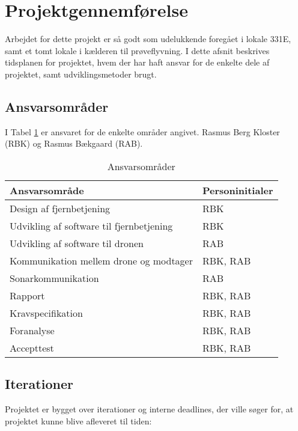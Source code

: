 \documentclass[Main]{subfiles}
\begin{document}
\section{Projektgennemførelse}
Arbejdet for dette projekt er så godt som udelukkende foregået i lokale 331E, samt et tomt lokale i kælderen til prøveflyvning.
I dette afsnit beskrives tidsplanen for projektet, hvem der har haft ansvar for de enkelte dele af projektet, samt udviklingsmetoder brugt.

\subsection{Ansvarsområder}
I Tabel \ref{Tab:ansvar} er ansvaret for de enkelte områder angivet.
Rasmus Berg Kloster (RBK) og Rasmus Bækgaard (RAB).
\begin{table}[H]
\centering
	\begin{tabular}{l l}
	\hline
	\textbf{Ansvarsområde} & \textbf{Personinitialer} \\ \hline
	Design af fjernbetjening & RBK\\
	Udvikling af software til fjernbetjening & RBK\\
	Udvikling af software til dronen & RAB\\
	Kommunikation mellem drone og modtager & RBK, RAB\\
	Sonarkommunikation & RAB\\
	Rapport & RBK, RAB\\
	Kravspecifikation & RBK, RAB\\
	Foranalyse & RBK, RAB\\
	Accepttest & RBK, RAB
	\\ \hline
	\end{tabular}
\caption{Ansvarsområder}
\label{Tab:ansvar}
\end{table}


\subsection{Iterationer}
Projektet er bygget over iterationer og interne deadlines, der ville søger for, at projektet kunne blive afleveret til tiden:
\end{document}
